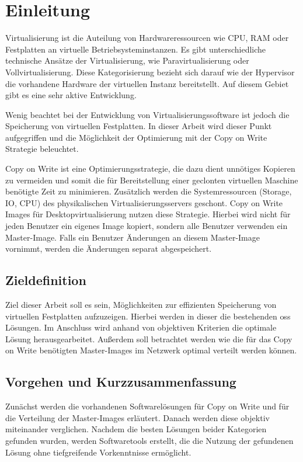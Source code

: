 \chapter{Einleitung}

Virtualisierung ist die Auteilung von Hardwareressourcen wie CPU, RAM oder Festplatten an virtuelle Betriebsysteminstanzen. Es gibt unterschiedliche technische Ansätze der Virtualisierung, wie Paravirtualisierung oder Vollvirtualisierung. Diese Kategorisierung bezieht sich darauf wie der Hypervisor die vorhandene Hardware der virtuellen Instanz bereitstellt. Auf diesem Gebiet gibt es eine sehr aktive Entwicklung. \cite{vor}

Wenig beachtet bei der Entwicklung von Virtualisierungssoftware ist jedoch die Speicherung von virtuellen Festplatten. In dieser Arbeit wird dieser Punkt aufgegriffen und die Möglichkeit der Optimierung mit der Copy on Write Strategie beleuchtet.

Copy on Write ist eine Optimierungsstrategie, die dazu dient unnötiges Kopieren zu vermeiden und somit die für Bereitstellung einer geclonten virtuellen Maschine benötigte Zeit zu minimieren. Zusätzlich werden die Systemressourcen (Storage, IO, CPU) des physikalischen Virtualisierungsservers geschont. Copy on Write Images für Desktopvirtualisierung nutzen diese Strategie. Hierbei wird nicht für jeden Benutzer ein eigenes Image kopiert, sondern alle Benutzer verwenden ein Master-Image. Falls ein Benutzer Änderungen an diesem Master-Image vornimmt, werden die Änderungen separat abgespeichert. 

\section{Zieldefinition}
Ziel dieser Arbeit soll es sein, Möglichkeiten zur effizienten Speicherung von virtuellen Festplatten aufzuzeigen. Hierbei werden in dieser die bestehenden \gls{oss} Lösungen. Im Anschluss wird anhand von objektiven Kriterien die optimale Lösung herausgearbeitet. Außerdem soll betrachtet werden wie die für das Copy on Write benötigten Master-Images im Netzwerk optimal verteilt werden können. 

\section{Vorgehen und Kurzzusammenfassung} 

Zunächst werden die vorhandenen Softwarelösungen für Copy on Write und für die Verteilung der Master-Images erläutert. Danach werden diese objektiv miteinander verglichen. Nachdem die besten Lösungen beider Kategorien gefunden wurden, werden Softwaretools erstellt, die die Nutzung der gefundenen Lösung ohne tiefgreifende Vorkenntnisse ermöglicht.

